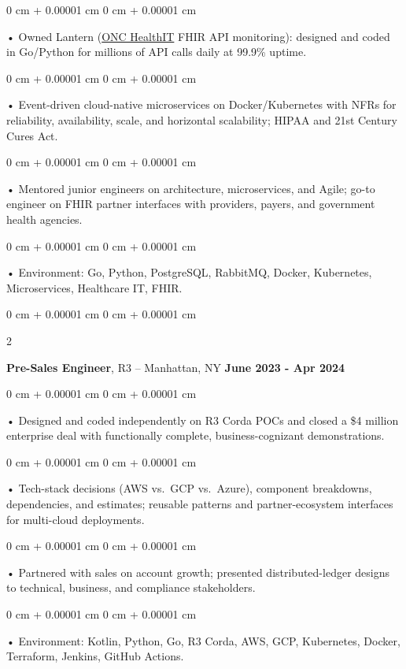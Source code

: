 \documentclass[10pt, letterpaper]{article}
\newenvironment{onecolentry}{
    \begin{adjustwidth}{
        0 cm + 0.00001 cm
    }{
        0 cm + 0.00001 cm
    }
}{
    \end{adjustwidth}
} %
\newenvironment{twocolentry}[2][]{
    \onecolentry
    \def\secondColumn{#2}
    \setcolumnwidth{\fill, 4.5 cm}
    \begin{paracol}{2}
}{
    \switchcolumn \raggedleft \secondColumn
    \end{paracol}
    \endonecolentry
} %
\begin{document}
        \begin{onecolentry}
             • Owned Lantern (\href{https://lantern.healthit.gov/?tab=dashboard_tab}{ONC HealthIT} FHIR API monitoring): designed and coded in Go/Python for millions of API calls daily at 99.9\% uptime.
        \end{onecolentry}
        \begin{onecolentry}
             • Event-driven cloud-native microservices on Docker/Kubernetes with NFRs for reliability, availability, scale, and horizontal scalability; HIPAA and 21st Century Cures Act.
        \end{onecolentry}
        \begin{onecolentry}
             • Mentored junior engineers on architecture, microservices, and Agile; go-to engineer on FHIR partner interfaces with providers, payers, and government health agencies.
        \end{onecolentry}
        \begin{onecolentry}
             • Environment: Go, Python, PostgreSQL, RabbitMQ, Docker, Kubernetes, Microservices, Healthcare IT, FHIR.
        \end{onecolentry}
        \vspace{0.1cm}

        \begin{twocolentry}{
            \textbf{June 2023 - Apr 2024}
        }
            \textbf{Pre-Sales Engineer}, R3 -- Manhattan, NY\end{twocolentry}

        \begin{onecolentry}
             • Designed and coded independently on R3 Corda POCs and closed a \$4 million enterprise deal with functionally complete, business-cognizant demonstrations.
        \end{onecolentry}
        \begin{onecolentry}
             • Tech-stack decisions (AWS vs.\ GCP vs.\ Azure), component breakdowns, dependencies, and estimates; reusable patterns and partner-ecosystem interfaces for multi-cloud deployments.
        \end{onecolentry}
        \begin{onecolentry}
             • Partnered with sales on account growth; presented distributed-ledger designs to technical, business, and compliance stakeholders.
        \end{onecolentry}
        \begin{onecolentry}
             • Environment: Kotlin, Python, Go, R3 Corda, AWS, GCP, Kubernetes, Docker, Terraform, Jenkins, GitHub Actions.
        \end{onecolentry}
        \vspace{0.1cm}
\end{document}

